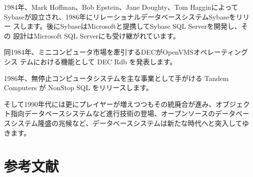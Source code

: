 1984年、Mark Hoffman、Bob Epstein、Jane Doughty、Tom Hagginによって
Sybaseが設立され、1986年にリレーショナルデータベースシステムSybaseをリリー
スします。後にSybaseはMicrosoftと提携してSybase SQL Serverを開発し、その
設計はMicrosoft SQL Serverにも受け継がれています。

同1984年、ミニコンピュータ市場を牽引するDECがOpenVMSオペレーティングシス
テムにおける機能として DEC Rdb を発表します。

1986年、無停止コンピュータシステムを主な事業として手がける Tandem
Computers が NonStop SQL をリリースします。

そして1990年代には更にプレイヤーが増えつつもその統廃合が進み、オブジェク
ト指向データベースシステムなど進行技術の登場、オープンソースのデータベー
スシステム隆盛の兆候など、データベースシステムは新たな時代へと突入してゆ
きます。

\section*{参考文献}

\small

